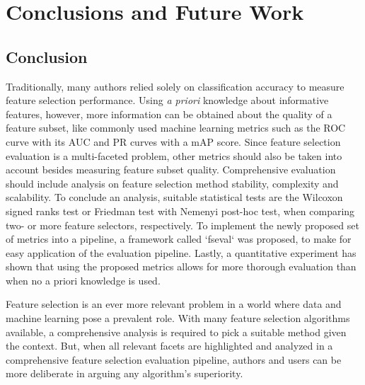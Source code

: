 \documentclass{article}
\begin{document}

\section{Conclusions and Future Work}\label{sec:conclusions-and-futurework}
\subsection{Conclusion}
Traditionally, many authors relied solely on classification accuracy to measure feature selection performance. Using \textit{a priori} knowledge about informative features, however, more information can be obtained about the quality of a feature subset, like commonly used machine learning metrics such as the ROC curve with its AUC and PR curves with a mAP score. Since feature selection evaluation is a multi-faceted problem, other metrics should also be taken into account besides measuring feature subset quality. Comprehensive evaluation should include analysis on feature selection method stability, complexity and scalability. To conclude an analysis, suitable statistical tests are the Wilcoxon signed ranks test or Friedman test with Nemenyi post-hoc test, when comparing two- or more feature selectors, respectively. To implement the newly proposed set of metrics into a pipeline, a framework called `fseval` was proposed, to make for easy application of the evaluation pipeline. Lastly, a quantitative experiment has shown that using the proposed metrics allows for more thorough evaluation than when no a priori knowledge is used. 

Feature selection is an ever more relevant problem in a world where data and machine learning pose a prevalent role. With many feature selection algorithms available, a comprehensive analysis is required to pick a suitable method given the context. But, when all relevant facets are highlighted and analyzed in a comprehensive feature selection evaluation pipeline, authors and users can be more deliberate in arguing any algorithm's superiority.
\end{document}
